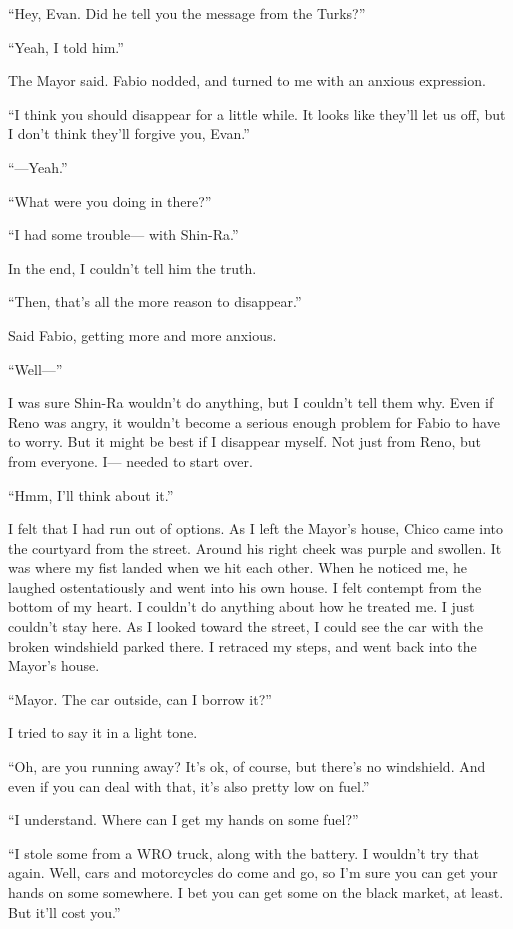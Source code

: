 \documentclass[oneside]{book}
\begin{document}
“Hey, Evan. Did he tell you the message from the Turks?”

“Yeah, I told him.”

The Mayor said. Fabio nodded, and turned to me with an anxious expression.

“I think you should disappear for a little while. It looks like they’ll let us off, but I don’t think they’ll forgive you, Evan.”

“—Yeah.”

“What were you doing in there?”

“I had some trouble— with Shin-Ra.”

In the end, I couldn’t tell him the truth.

“Then, that’s all the more reason to disappear.”

Said Fabio, getting more and more anxious.

“Well—”

I was sure Shin-Ra wouldn’t do anything, but I couldn’t tell them why. Even if Reno was angry, it wouldn’t become a serious enough problem for Fabio to have to worry. But it might be best if I disappear myself. Not just from Reno, but from everyone. I— needed to start over.

“Hmm, I’ll think about it.”

I felt that I had run out of options. As I left the Mayor’s house, Chico came into the courtyard from the street. Around his right cheek was purple and swollen. It was where my fist landed when we hit each other. When he noticed me, he laughed ostentatiously and went into his own house. I felt contempt from the bottom of my heart. I couldn’t do anything about how he treated me. I just couldn’t stay here. As I looked toward the street, I could see the car with the broken windshield parked there. I retraced my steps, and went back into the Mayor’s house.

“Mayor. The car outside, can I borrow it?”

I tried to say it in a light tone.

“Oh, are you running away? It’s ok, of course, but there’s no windshield. And even if you can deal with that, it’s also pretty low on fuel.”

“I understand. Where can I get my hands on some fuel?”

“I stole some from a WRO truck, along with the battery. I wouldn’t try that again. Well, cars and motorcycles do come and go, so I’m sure you can get your hands on some somewhere. I bet you can get some on the black market, at least. But it’ll cost you.”
\end{document}
